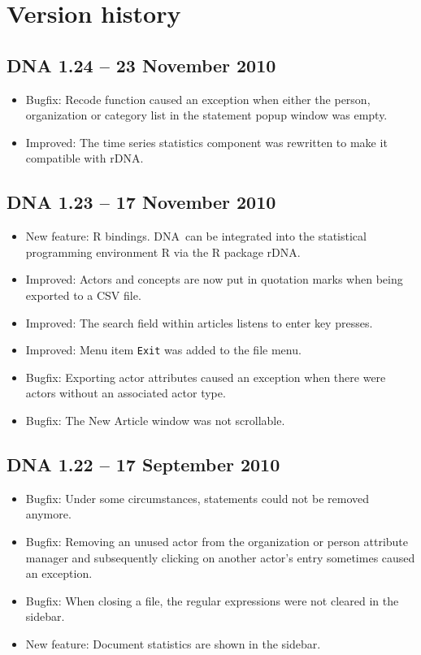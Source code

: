 \documentclass[12pt,a4paper]{scrreprt}
\newcommand{\dnashort}{\textsc{DNA}}
\newcommand{\code}[1]{\texttt{#1}}
\begin{document}
\chapter{Version history}

\section*{DNA 1.24 -- 23 November 2010}
\begin{itemize}
 \item Bugfix: Recode function caused an exception when either the person, organization or category list in the statement popup window was empty.
 \item Improved: The time series statistics component was rewritten to make it compatible with rDNA.
\end{itemize}

\section*{DNA 1.23 -- 17 November 2010}
\begin{itemize}
 \item New feature: R bindings. \dnashort\ can be integrated into the statistical programming environment R via the R package rDNA.
 \item Improved: Actors and concepts are now put in quotation marks when being exported to a CSV file.
 \item Improved: The search field within articles listens to enter key presses.
 \item Improved: Menu item \code{Exit} was added to the file menu.
 \item Bugfix: Exporting actor attributes caused an exception when there were actors without an associated actor type.
 \item Bugfix: The New Article window was not scrollable.
\end{itemize}

\section*{DNA 1.22 -- 17 September 2010}
\begin{itemize}
 \item Bugfix: Under some circumstances, statements could not be removed anymore.
 \item Bugfix: Removing an unused actor from the organization or person attribute manager and subsequently clicking on another actor's entry sometimes caused an exception.
 \item Bugfix: When closing a file, the regular expressions were not cleared in the sidebar.
 \item New feature: Document statistics are shown in the sidebar.
\end{itemize}
\end{document}
